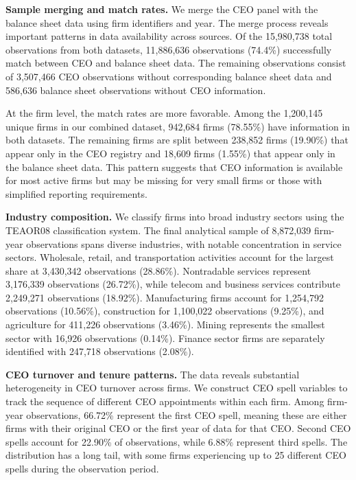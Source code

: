 \documentclass[11pt,a4paper]{article}
\begin{document}
\textbf{Sample merging and match rates.} We merge the CEO panel with the balance sheet data using firm identifiers and year. The merge process reveals important patterns in data availability across sources. Of the 15,980,738 total observations from both datasets, 11,886,636 observations (74.4\%) successfully match between CEO and balance sheet data. The remaining observations consist of 3,507,466 CEO observations without corresponding balance sheet data and 586,636 balance sheet observations without CEO information.

At the firm level, the match rates are more favorable. Among the 1,200,145 unique firms in our combined dataset, 942,684 firms (78.55\%) have information in both datasets. The remaining firms are split between 238,852 firms (19.90\%) that appear only in the CEO registry and 18,609 firms (1.55\%) that appear only in the balance sheet data. This pattern suggests that CEO information is available for most active firms but may be missing for very small firms or those with simplified reporting requirements.

\textbf{Industry composition.} We classify firms into broad industry sectors using the TEAOR08 classification system. The final analytical sample of 8,872,039 firm-year observations spans diverse industries, with notable concentration in service sectors. Wholesale, retail, and transportation activities account for the largest share at 3,430,342 observations (28.86\%). Nontradable services represent 3,176,339 observations (26.72\%), while telecom and business services contribute 2,249,271 observations (18.92\%). Manufacturing firms account for 1,254,792 observations (10.56\%), construction for 1,100,022 observations (9.25\%), and agriculture for 411,226 observations (3.46\%). Mining represents the smallest sector with 16,926 observations (0.14\%). Finance sector firms are separately identified with 247,718 observations (2.08\%).

\textbf{CEO turnover and tenure patterns.} The data reveals substantial heterogeneity in CEO turnover across firms. We construct CEO spell variables to track the sequence of different CEO appointments within each firm. Among firm-year observations, 66.72\% represent the first CEO spell, meaning these are either firms with their original CEO or the first year of data for that CEO. Second CEO spells account for 22.90\% of observations, while 6.88\% represent third spells. The distribution has a long tail, with some firms experiencing up to 25 different CEO spells during the observation period.
\end{document}
